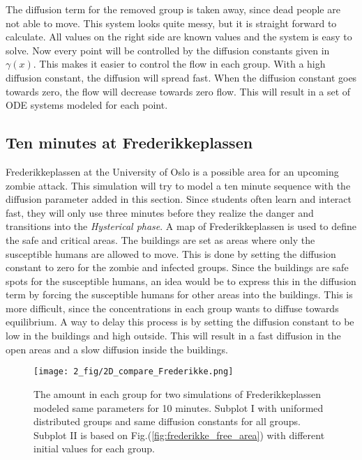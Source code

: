 \documentclass[%
twoside,                 %
final,                   %
chapterprefix=true,      %
open=right               %
10pt]{book}
\begin{document}
The diffusion term for the removed group is taken away, since dead people are not able to move. This system looks quite messy, but it is straight forward to calculate. All values on the right side are known values and the system is easy to solve. Now every point will be controlled by the diffusion constants given in $\gamma(x)$. This makes it easier to control the flow in each group. With a high diffusion constant, the diffusion will spread fast. When the diffusion constant goes towards zero, the flow will decrease towards zero flow. This will result in a set of ODE systems modeled for each point.

\subsection{Ten minutes at Frederikkeplassen}
\label{section:2_frederikke}
Frederikkeplassen at the University of Oslo is a possible area for an upcoming zombie attack. This simulation will try to model a ten minute sequence with the diffusion parameter added in this section. Since students often learn and interact fast, they will only use three minutes before they realize the danger and transitions into the \emph{Hysterical phase}. A map of Frederikkeplassen is used to define the safe and critical areas. The buildings are set as areas where only the susceptible humans are allowed to move. This is done by setting the diffusion constant to zero for the zombie and infected groups. Since the buildings are safe spots for the susceptible humans, an idea would be to express this in the diffusion term by forcing the susceptible humans for other areas into the buildings. This is more difficult, since the concentrations in each group wants to diffuse towards equilibrium. A way to delay this process is by setting the diffusion constant to be low in the buildings and high outside. This will result in a fast diffusion in the open areas and a slow diffusion inside the buildings. 


\begin{figure}[ht]
  \centerline{\texttt{[image: 2\_fig/2D\_compare\_Frederikke.png]}}
  \caption{
  \label{fig:frederikke_numbers} The amount in each group for two simulations of Frederikkeplassen modeled same parameters for 10 minutes. Subplot I with uniformed distributed groups and same diffusion constants for all groups. Subplot II is based on Fig.(\ref{fig:frederikke_free_area}) with different initial values for each group.
  }
\end{figure}
\end{document}
